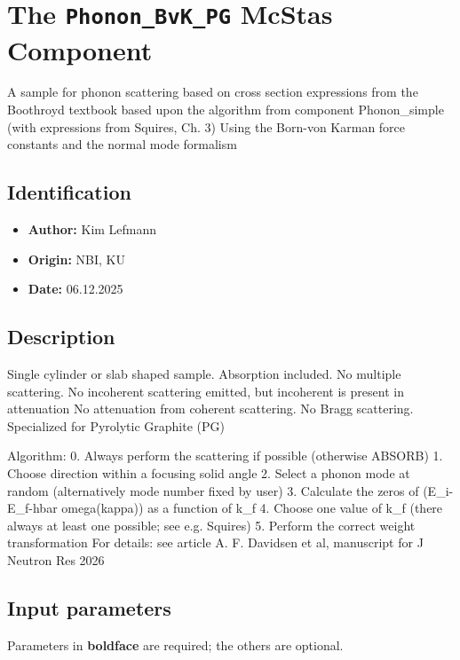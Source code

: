 \section{The \texttt{Phonon\_BvK\_PG} McStas Component}
A sample for phonon scattering based on cross section expressions from the Boothroyd textbook
based upon the algorithm from component Phonon\_simple (with expressions from Squires, Ch. 3)
Using the Born-von Karman force constants and the normal mode formalism

\subsection*{Identification}
\begin{itemize}
  \item \textbf{Author:} Kim Lefmann
  \item \textbf{Origin:} NBI, KU
  \item \textbf{Date:} 06.12.2025
\end{itemize}

\subsection*{Description}
Single cylinder or slab shaped sample. Absorption included. No multiple scattering. No incoherent scattering emitted, but incoherent is present in attenuation No attenuation from coherent scattering. No Bragg scattering. Specialized for Pyrolytic Graphite (PG)

Algorithm: 0. Always perform the scattering if possible (otherwise ABSORB) 1. Choose direction within a focusing solid angle 2. Select a phonon mode at random (alternatively mode number fixed by user) 3. Calculate the zeros of (E\_i-E\_f-hbar omega(kappa)) as a function of k\_f 4. Choose one value of k\_f (there always at least one possible; see e.g. Squires) 5. Perform the correct weight transformation For details: see article A. F. Davidsen et al, manuscript for J Neutron Res 2026

\subsection*{Input parameters}
Parameters in \textbf{boldface} are required; the others are optional.

